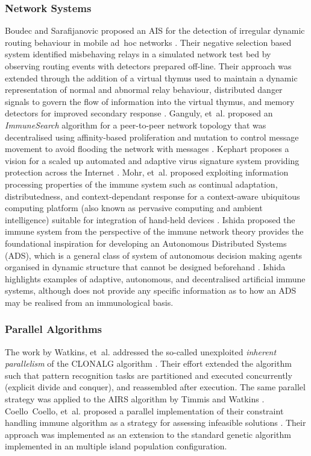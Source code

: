 %
%
\subsubsection{Network Systems}
Boudec and Sarafijanovic proposed an AIS for the detection of irregular dynamic routing behaviour in mobile ad~hoc networks \cite{Boudec2004}. Their negative selection based system identified misbehaving relays in a simulated network test bed by observing routing events with detectors prepared off-line. Their approach was extended through the addition of a virtual thymus used to maintain a dynamic representation of normal and abnormal relay behaviour, distributed danger signals to govern the flow of information into the virtual thymus, and memory detectors for improved secondary response \cite{Sarafijanovic2004, Sarafijanovic2005}. 
Ganguly, et~al. proposed an \emph{ImmuneSearch} algorithm for a peer-to-peer network topology that was decentralised using affinity-based proliferation and mutation to control message movement to avoid flooding the network with messages \cite{Ganguly2004}.
Kephart proposes a vision for a scaled up automated and adaptive virus signature system providing protection across the Internet \cite{Kephart1997a}. Mohr, et~al. proposed exploiting information processing properties of the immune system such as continual adaptation, distributedness, and context-dependant response for a context-aware ubiquitous computing platform (also known as pervasive computing and ambient intelligence) suitable for integration of hand-held devices \cite{Mohr2004}. Ishida proposed the immune system from the perspective of the immune network theory provides the foundational inspiration for developing an Autonomous Distributed Systems (ADS), which is a general class of system of autonomous decision making agents organised in dynamic structure that cannot be designed beforehand \cite{Ishida1998}. Ishida highlights examples of adaptive, autonomous, and decentralised artificial immune systems, although does not provide any specific information as to how an ADS may be realised from an immunological basis.

%
%
\subsubsection{Parallel Algorithms}
The work by Watkins, et~al. addressed the so-called unexploited \emph{inherent parallelism} of the CLONALG algorithm \cite{Watkins2003}. Their effort extended the algorithm such that pattern recognition tasks are partitioned and executed concurrently (explicit divide and conquer), and reassembled after execution. The same parallel strategy was applied to the AIRS algorithm by Timmis and Watkins \cite{Watkins2004}. Coello~Coello, et~al. proposed a parallel implementation of their constraint handling immune algorithm as a strategy for assessing infeasible solutions \cite{Coello2002a, Coello2004}. Their approach was implemented as an extension to the standard genetic algorithm implemented in an multiple island population configuration.

